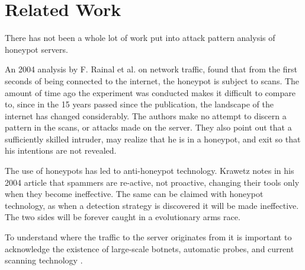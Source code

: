 \section{Related Work}
\label{sec:relatedWork}


There has not been a whole lot of work 
put into attack pattern analysis of honeypot
servers.


An 2004 analysis by F. Rainal et al. \cite{1324605}
on network traffic, found that from the first 
seconds of being connected to the internet, the 
honeypot is subject to scans. The amount of time 
ago the experiment was conducted makes it difficult
to compare to, since in the 15 years passed since the
publication, the landscape of the internet has changed 
considerably. 
The authors  make no attempt to discern a pattern
in the scans, or attacks made on the server. They also
point out that a sufficiently skilled intruder, may 
realize that he is in a honeypot, and exit so that 
his intentions are not revealed.



The use of honeypots has led to anti-honeypot technology.
Krawetz \cite{1264861} 
notes in his 2004 article that spammers are re-active,
not proactive, changing their tools only when they 
become ineffective. The same can be claimed with honeypot
technology, as when a detection strategy is discovered
it will be made ineffective. The two sides will be forever
caught in a evolutionary arms race.



To understand where the traffic to the server originates from
it is important to acknowledge the existence of large-scale 
botnets\cite{AbuRajab:2006:MAU:1177080.1177086}, automatic
probes, and current scanning technology \cite{6657498}.

